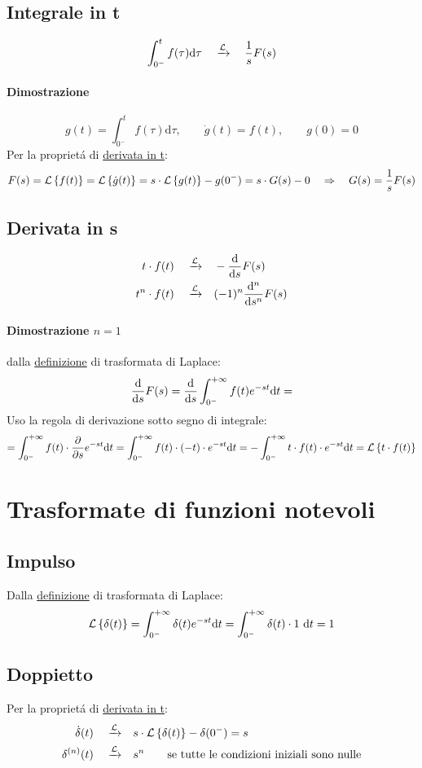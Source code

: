 \documentclass[../main.tex]{subfiles}
\begin{document}
	\subsection{Integrale in t}
		\label{sec:int_t}
		\[
			\int_{0^{-}}^{t} f(\tau) \mathrm{d}\tau \quad \xrightarrow{\mathcal{L}} \quad \frac{1}{s} F(s)
		\]
		\paragraph{Dimostrazione}
		\[
			g(t) = \int_{0^{-}}^{t} f(\tau) \mathrm{d}\tau, \qquad \dot{g}(t) = f(t), \qquad g(0) = 0
		\]
		Per la propriet\'{a} di \hyperref[sec:deriv_t]{derivata in t}:
		\[
			F(s) = \mathcal{L} \left\lbrace f(t) \right\rbrace = \mathcal{L} \left\lbrace \dot{g}(t) \right\rbrace = s \cdot \mathcal{L} \left\lbrace g(t) \right\rbrace - g(0^{-}) = s \cdot G(s) - 0 \quad \Rightarrow \quad G(s) = \frac{1}{s} F(s)
		\]
		
	\subsection{Derivata in s}
		\label{sec:deriv_s}
		\begin{align*}
			t \cdot f(t) \quad \xrightarrow{\mathcal{L}} \quad &- \frac{\mathrm{d} }{\mathrm{d} s} F(s)\\
			t^n \cdot f(t) \quad \xrightarrow{\mathcal{L}} \quad &(-1)^n \frac{\mathrm{d}^n}{\mathrm{d}s^n} F(s)
		\end{align*}
		\paragraph{Dimostrazione $ n=1 $}
		dalla \hyperref[sec:trasformata_laplace]{definizione} di trasformata di Laplace:
		\[
			\frac{\mathrm{d} }{\mathrm{d} s} F(s) = \frac{\mathrm{d} }{\mathrm{d} s} \int_{0^{-}}^{+\infty} f(t) e^{- s t} \mathrm{d} t =
		\]
		Uso la regola di derivazione sotto segno di integrale:
		\[
			= \int_{0^{-}}^{+\infty} f(t) \cdot \frac{\partial }{\partial s} e^{- s t} \mathrm{d} t = \int_{0^{-}}^{+\infty} f(t) \cdot (-t) \cdot e^{- s t} \mathrm{d} t = - \int_{0^{-}}^{+\infty} t \cdot f(t) \cdot  e^{- s t} \mathrm{d} t=\mathcal{L} \left\lbrace t \cdot f(t) \right\rbrace
		\]

	\section{Trasformate di funzioni notevoli}
	\subsection{Impulso}
		\label{sec:trasf_impulso}
		Dalla \hyperref[sec:trasformata_laplace]{definizione} di trasformata di Laplace:
		\[
			\mathcal{L} \left\lbrace \delta (t) \right\rbrace = \int_{0^{-}}^{+\infty} \delta (t) e^{- s t} \mathrm{d} t = \int_{0^{-}}^{+ \infty} \delta(t) \cdot 1\ \mathrm{d}t = 1
		\]

	\subsection{Doppietto}
		\label{sec:trasf_doppietto}
		Per la propriet\'{a} di \hyperref[sec:deriv_t]{derivata in t}:
		\begin{align*}
			\dot{\delta}(t) \quad \xrightarrow{\mathcal{L}} \quad &s \cdot \mathcal{L} \left\lbrace \delta(t) \right\rbrace - \delta(0^-) = s
			\\
			\delta^{(n)}(t) \quad \xrightarrow{\mathcal{L}} \quad &s^n \qquad \text{se tutte le condizioni iniziali sono nulle}
		\end{align*}
\end{document}
